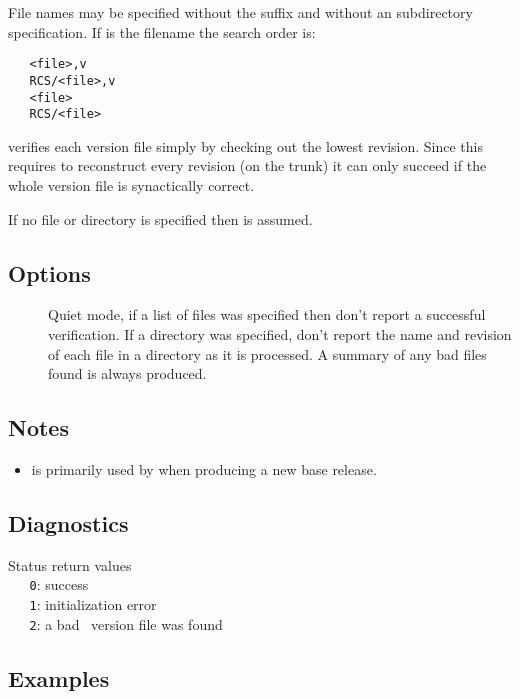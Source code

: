 File names may be specified without the  suffix and without an
 subdirectory specification.  If  is the filename the
search order is:

\begin{verbatim}
   <file>,v
   RCS/<file>,v
   <file>
   RCS/<file>
\end{verbatim}

 verifies each version file simply by checking out the lowest
revision.  Since this requires  to reconstruct every revision (on
the trunk) it can only succeed if the whole version file is synactically
correct.

If no file or directory is specified then  is assumed.

\subsection*{Options}

\begin{description}
\item[]
   Quiet mode, if a list of files was specified then don't report a successful
   verification.  If a directory was specified, don't report the name and
   revision of each file in a directory as it is processed.  A summary of any
   bad files found is always produced.
\end{description}

\subsection*{Notes}
 
\begin{itemize}
\item
    is primarily used by  when producing a new base
   release.
\end{itemize}

\subsection*{Diagnostics}

Status return values
\\ \verb+   0+: success
\\ \verb+   1+: initialization error
\\ \verb+   2+: a bad \rcs\ version file was found

\subsection*{Examples}

